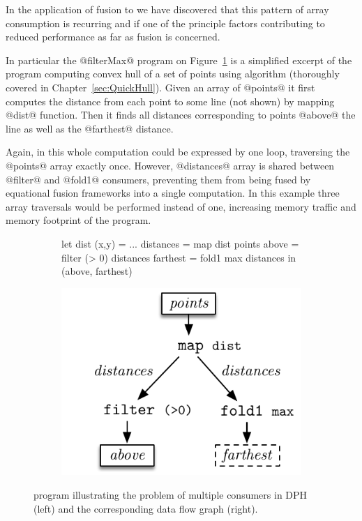 \documentclass[preamble.tex]{subfiles}
\begin{document}
In the application of fusion to \DPH\idph we have discovered that this pattern of array consumption is recurring and if one of the principle factors contributing to reduced performance as far as fusion is concerned.

In particular the @filterMax@ program on Figure~\ref{fig:filterMax} is a simplified excerpt of the \DPH program computing convex hull of a set of points using \QuickHull\iqh algorithm (thoroughly covered in Chapter~\ref{sec:QuickHull}). Given an array of @points@ it first computes the distance from each point to some line (not shown) by mapping @dist@ function. Then it finds all distances corresponding to points @above@ the line as well as the @farthest@ distance.

Again, in \C this whole computation could be expressed by one loop, traversing the @points@ array exactly once. However, @distances@ array is shared between @filter@ and @fold1@ consumers, preventing them from being fused by equational fusion frameworks into a single computation. In this example three array traversals would be performed instead of one, increasing memory traffic and memory footprint of the program.


\begin{figure}

\begin{subfigure}{.6\textwidth}%
\begin{hscode}
let dist (x,y) = ...
    distances  = map dist points
    above      = filter (> 0) distances
    farthest   = fold1 max distances
in  (above, farthest)
\end{hscode}
\end{subfigure}%
%
\begin{subfigure}{.4\textwidth}%
\includegraphics[center,scale=0.85]{img/DFD-Flat-FilterMax-2}%
\end{subfigure}%

\caption{ program illustrating the problem of multiple consumers in DPH (left) and the corresponding data flow graph (right).}
\label{fig:filterMax}
\end{figure}
\end{document}
